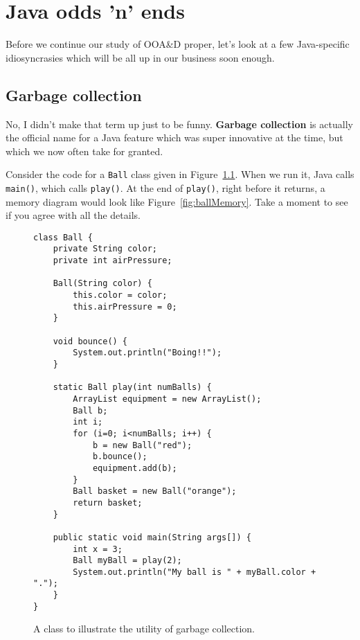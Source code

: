 
\chapter{Java odds 'n' ends}

Before we continue our study of OOA\&D proper, let's look at a few
Java-specific idiosyncrasies which will be all up in our business soon enough.

\section{Garbage collection}

No, I didn't make that term up just to be funny. \textbf{Garbage collection}
is actually the official name for a Java feature which was super innovative at
the time, but which we now often take for granted.

Consider the code for a \texttt{Ball} class given in
Figure~\ref{fig:ballCode}. When we run it, Java calls \texttt{main()}, which
calls \texttt{play()}. At the end of \texttt{play()}, right before it returns,
a memory diagram would look like Figure~\ref{fig:ballMemory}. Take a moment to
see if you agree with all the details.

\begin{figure}[ht]
\begin{Verbatim}[fontsize=\scriptsize,samepage=true,frame=single]
class Ball {
    private String color;
    private int airPressure;

    Ball(String color) {
        this.color = color;
        this.airPressure = 0;
    }

    void bounce() {
        System.out.println("Boing!!");
    }

    static Ball play(int numBalls) {
        ArrayList equipment = new ArrayList();
        Ball b;
        int i;
        for (i=0; i<numBalls; i++) {
            b = new Ball("red");
            b.bounce();
            equipment.add(b);
        }
        Ball basket = new Ball("orange");
        return basket;
    }

    public static void main(String args[]) {
        int x = 3;
        Ball myBall = play(2);
        System.out.println("My ball is " + myBall.color + ".");
    }
}
\end{Verbatim}
\caption{A class to illustrate the utility of garbage collection.}
\label{fig:ballCode}
\end{figure}

